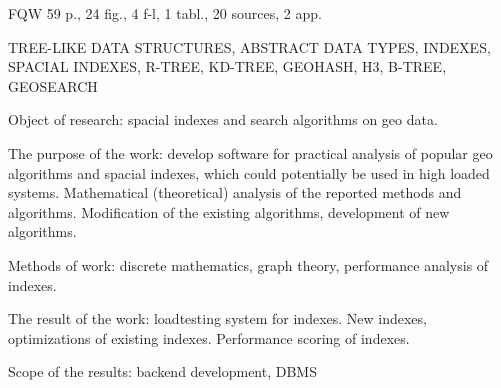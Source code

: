 \ReferatEN

FQW 59 p., 24 fig., 4 f-l, 1 tabl., 20 sources, 2 app.

\noindent TREE-LIKE DATA STRUCTURES, ABSTRACT DATA TYPES, INDEXES, SPACIAL INDEXES, R-TREE, KD-TREE, GEOHASH, H3, B-TREE, GEOSEARCH


Object of research: spacial indexes and search algorithms on geo data.

The purpose of the work: develop software for practical analysis of popular geo algorithms and spacial indexes, which could potentially be used in high loaded systems. Mathematical (theoretical) analysis of the reported methods and algorithms. Modification of the existing algorithms, development of new algorithms. 

Methods of work: discrete mathematics, graph theory, performance analysis of indexes.

The result of the work: loadtesting system for indexes. New indexes, optimizations of existing indexes. Performance scoring of indexes.

Scope of the results: backend development, DBMS



